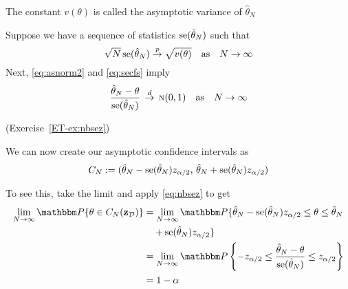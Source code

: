 \begin{frame}

    \vspace{2em}
    The constant $v(\theta)$ is called the asymptotic variance 
    of $\hat \theta_N$
    
    \vspace{.7em}
    Suppose we have a sequence of statistics $\operatorname{se}(\hat \theta_N)$
    such that
    \begin{equation}
        \label{eq:secfs}
        \sqrt{N} \operatorname{se}(\hat \theta_N)
            \stackrel { p } {\to} \sqrt{v(\theta)} 
            \quad \text{as} \quad
            N \to \infty
    \end{equation}
    Next, \eqref{eq:asnorm2} and
    \eqref{eq:secfs} imply 
    \begin{equation}
        \label{eq:nbsez}
        \frac{\hat \theta_N - \theta}{\operatorname{se}(\hat \theta_N)} 
        \, \stackrel { d } {\to} \, \textrm{\sc n}(0, 1)
        \quad \text{as} \quad
        N \to \infty
    \end{equation}
    
    (Exercise~\ref{ET-ex:nbsez})
    

\end{frame}

\begin{frame}

    \vspace{2em}
    We can now create our asymptotic confidence intervals as
    \begin{equation*}
        \label{eq:sacine}
        C_N := 
        (\hat \theta_N - \operatorname{se}(\hat \theta_N) z_{\alpha/2}, 
        \, \hat \theta_N + \operatorname{se}(\hat \theta_N) z_{\alpha/2})
    \end{equation*}
    
    To see this, take the limit and apply \eqref{eq:nbsez} to get
    \begin{align*}
        \lim_{N \to \infty} \PP \{ \theta \in C_N(\zdata) \} 
        & = \lim_{N \to \infty} 
            \PP
                \{ 
                \hat \theta_N - 
                    \se(\hat \theta_N) z_{\alpha/2}
                \leq \theta \leq 
                \hat \theta_N \\
        &\quad + \se(\hat \theta_N) z_{\alpha/2}
                    \} \\
        & = \lim_{N \to \infty} 
            \PP 
                \left\{ 
                    -z_{\alpha/2}
                    \leq \frac{\hat \theta_N - \theta}{\se(\hat \theta_N)}
                    \leq z_{\alpha/2}
                \right\} \\
        & = 1 - \alpha
    \end{align*}
    
\end{frame}

